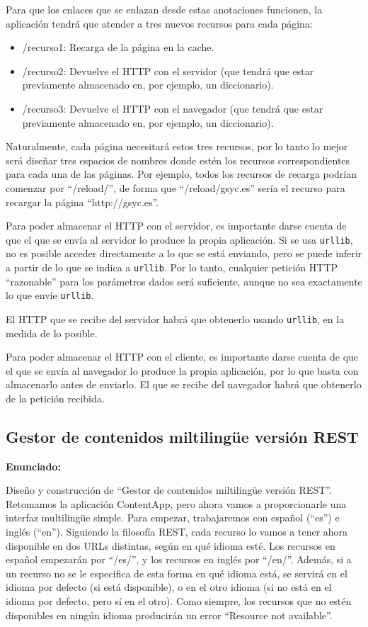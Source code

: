 Para que los enlaces que se enlazan desde estas anotaciones funcionen, la aplicación tendrá que atender a tres nuevos recursos para cada página:

\begin{itemize}
\item /recurso1: Recarga de la página en la cache.
\item /recurso2: Devuelve el HTTP con el servidor (que tendrá que estar previamente almacenado en, por ejemplo, un diccionario).
\item /recurso3: Devuelve el HTTP con el navegador (que tendrá que estar previamente almacenado en, por ejemplo, un diccionario).
\end{itemize}

Naturalmente, cada página necesitará estos tres recursos, por lo tanto lo mejor será diseñar tres espacios de nombres donde estén los recursos correspondientes para cada una de las páginas. Por ejemplo, todos los recursos de recarga podrían comenzar por ``/reload/'', de forma que ``/reload/gsyc.es'' sería el recurso para recargar la página ``http://gsyc.es''.

Para poder almacenar el HTTP con el servidor, es importante darse cuenta de que el que se envía al servidor lo produce la propia aplicación. Si se usa \texttt{urllib}, no es posible acceder directamente a lo que se está enviando, pero se puede inferir a partir de lo que se indica a \texttt{urllib}. Por lo tanto, cualquier petición HTTP ``razonable'' para los parámetros dados será suficiente, aunque no sea exactamente lo que envíe \texttt{urllib}.

El HTTP que se recibe del servidor habrá que obtenerlo usando \texttt{urllib}, en la medida de lo posible.

Para poder almacenar el HTTP con el cliente, es importante darse cuenta de que el que se envía al navegador lo produce la propia aplicación, por lo que basta con almacenarlo antes de enviarlo. El que se recibe del navegador habrá que obtenerlo de la petición recibida.

\subsection{Gestor de contenidos miltilingüe versión REST}
\label{subsec:contentappmulti}

\textbf{Enunciado:}

Diseño y construcción de ``Gestor de contenidos miltilingüe versión REST''. Retomamos la aplicación ContentApp, pero ahora vamos a proporcionarle una interfaz multilingüe simple. Para empezar, trabajaremos con español (``es'') e inglés (``en''). Siguiendo la filosofía REST, cada recurso lo vamos a tener ahora disponible en dos URLs distintas, según en qué idioma esté. Los recursos en español empezarán por ``/es/'', y los recursos en inglés por ``/en/''. Además, si a un recurso no se le especifica de esta forma en qué idioma está, se servirá en el idioma por defecto (si está disponible), o en el otro idioma (si no está en el idioma por defecto, pero sí en el otro). Como siempre, los recursos que no estén disponibles en ningún idioma producirán un error ``Resource not available''.

